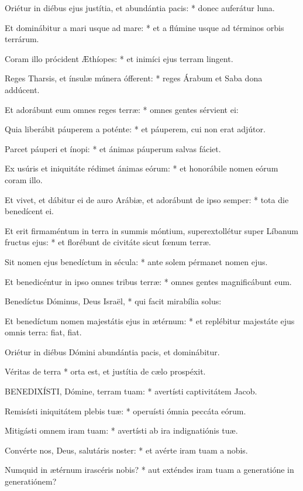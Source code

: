 Oriétur in diébus ejus justítia, et abundántia pacis: * donec auferátur luna.

Et dominábitur a mari usque ad mare: * et a flúmine usque ad términos orbis terrárum.

Coram illo prócident Æthíopes: * et inimíci ejus terram lingent.

Reges Tharsis, et ínsulæ múnera ófferent: * reges Árabum et Saba dona addúcent.

Et adorábunt eum omnes reges terræ: * omnes gentes sérvient ei:

Quia liberábit páuperem a poténte: * et páuperem, cui non erat adjútor.

Parcet páuperi et ínopi: * et ánimas páuperum salvas fáciet.

Ex usúris et iniquitáte rédimet ánimas eórum: * et honorábile nomen eórum coram illo.

Et vivet, et dábitur ei de auro Arábiæ, et adorábunt de ipso semper: * tota die benedícent ei.

Et erit firmaméntum in terra in summis móntium, superextollétur super Líbanum fructus ejus: * et florébunt de civitáte sicut fœnum terræ.

Sit nomen ejus benedíctum in sécula: * ante solem pérmanet nomen ejus.

Et benedicéntur in ipso omnes tribus terræ: * omnes gentes magnificábunt eum.

Benedíctus Dóminus, Deus Israël, * qui facit mirabília solus:

Et benedíctum nomen majestátis ejus in ætérnum: * et replébitur majestáte ejus omnis terra: fiat, fiat.

 Oriétur in diébus Dómini abundántia pacis, et dominábitur.

 Véritas de terra * orta est, et justítia de cælo prospéxit.


\lettrine[lines=2]{B}{ENEDIXÍSTI}, Dómine, terram tuam: * avertísti captivitátem Jacob.

Remisísti iniquitátem plebis tuæ: * operuísti ómnia peccáta eórum.

Mitigásti omnem iram tuam: * avertísti ab ira indignatiónis tuæ.

Convérte nos, Deus, salutáris noster: * et avérte iram tuam a nobis.

Numquid in ætérnum irascéris nobis? * aut exténdes iram tuam a generatióne in generatiónem?

